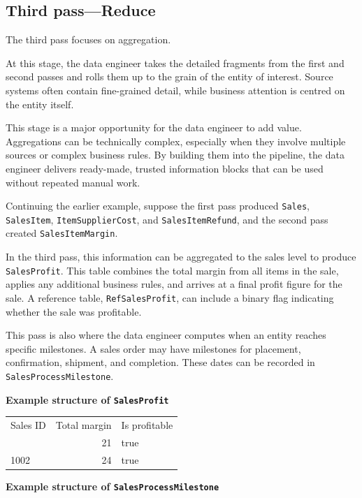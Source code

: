 \documentclass[10pt,openany,10pt]{book}
\newcounter{none}
\let\podeToprule\toprule
\let\podeMidrule\midrule
\let\podeBottomrule\bottomrule
\renewcommand{\toprule}{\arrayrulecolor{pbiGrid}\podeToprule}
\renewcommand{\midrule}{\arrayrulecolor{pbiGrid}\podeMidrule}
\renewcommand{\bottomrule}{\arrayrulecolor{pbiGrid}\podeBottomrule}
\begin{document}
\subsection{Third pass---Reduce}\label{third-passreduce}

The third pass focuses on aggregation.

At this stage, the data engineer takes the detailed fragments from the
first and second passes and rolls them up to the grain of the entity of
interest. Source systems often contain fine-grained detail, while
business attention is centred on the entity itself.

This stage is a major opportunity for the data engineer to add value.
Aggregations can be technically complex, especially when they involve
multiple sources or complex business rules. By building them into the
pipeline, the data engineer delivers ready-made, trusted information
blocks that can be used without repeated manual work.

Continuing the earlier example, suppose the first pass produced
\texttt{Sales}, \texttt{SalesItem}, \texttt{ItemSupplierCost}, and
\texttt{SalesItemRefund}, and the second pass created
\texttt{SalesItemMargin}.

In the third pass, this information can be aggregated to the sales level
to produce \texttt{SalesProfit}. This table combines the total margin
from all items in the sale, applies any additional business rules, and
arrives at a final profit figure for the sale. A reference table,
\texttt{RefSalesProfit}, can include a binary flag indicating whether
the sale was profitable.

This pass is also where the data engineer computes when an entity
reaches specific milestones. A sales order may have milestones for
placement, confirmation, shipment, and completion. These dates can be
recorded in \texttt{SalesProcessMilestone}.

\textbf{Example structure of \texttt{SalesProfit}}

{\def\LTcaptype{none} %
\begin{longtable}[]{@{}lrl@{}}
\toprule\noalign{}
Sales ID & Total margin & Is profitable \\
\midrule\noalign{}
\endhead
\bottomrule\noalign{}
\endlastfoot
1001 & 21 & true \\
1002 & 24 & true \\
\end{longtable}
}

\textbf{Example structure of \texttt{SalesProcessMilestone}}
\end{document}

